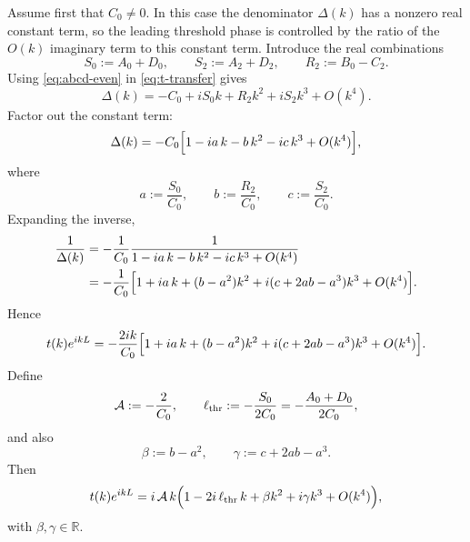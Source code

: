 \documentclass[aps,pra,preprint,notitlepage,nofootinbib]{revtex4-2}
\begin{document}
Assume first that $C_0\neq0$. In this case the denominator
\(\Delta(k)\) has a nonzero real constant term, so the leading threshold
phase is controlled by the ratio of the \(O(k)\) imaginary term to this
constant term. Introduce the real combinations
\begin{equation}
S_0:=A_0+D_0,
\qquad
S_2:=A_2+D_2,
\qquad
R_2:=B_0-C_2.
\label{eq:generic-combos}
\end{equation}
Using \eqref{eq:abcd-even} in \eqref{eq:t-transfer} gives
\begin{equation}
\Delta(k)
=
-C_0+iS_0k+R_2k^2+iS_2k^3+O(k^4).
\label{eq:Delta-generic}
\end{equation}
Factor out the constant term:
\begin{equation}
\Delta(k)
=
-C_0\Bigl[1-ia\,k-b\,k^2-ic\,k^3+O(k^4)\Bigr],
\label{eq:Delta-generic-factor}
\end{equation}
where
\begin{equation}
a:=\frac{S_0}{C_0},
\qquad
b:=\frac{R_2}{C_0},
\qquad
c:=\frac{S_2}{C_0}.
\label{eq:abc-generic}
\end{equation}
Expanding the inverse,
\begin{align}
\frac{1}{\Delta(k)}
&=
-\frac{1}{C_0}
\frac{1}{1-ia\,k-b\,k^2-ic\,k^3+O(k^4)}
\nonumber\\
&=
-\frac{1}{C_0}
\Bigl[
1+ia\,k+(b-a^2)k^2+i(c+2ab-a^3)k^3+O(k^4)
\Bigr].
\label{eq:generic-inverse}
\end{align}
Hence
\begin{equation}
t(k)e^{ikL}
=
-\frac{2ik}{C_0}
\Bigl[
1+ia\,k+(b-a^2)k^2+i(c+2ab-a^3)k^3+O(k^4)
\Bigr].
\end{equation}
Define
\begin{equation}
\mathcal A:=-\frac{2}{C_0},
\qquad
\ell_{\rm thr}:=-\frac{S_0}{2C_0}=-\frac{A_0+D_0}{2C_0},
\label{eq:A-ell-def}
\end{equation}
and also
\begin{equation}
\beta:=b-a^2,
\qquad
\gamma:=c+2ab-a^3.
\end{equation}
Then
\begin{equation}
t(k)e^{ikL}
=
i\,\mathcal A\,k
\Bigl(
1-2i\,\ell_{\rm thr}\,k+\beta k^2+i\gamma k^3+O(k^4)
\Bigr),
\label{eq:t-generic-final-app}
\end{equation}
with $\beta,\gamma\in\mathbb R$.
\end{document}
